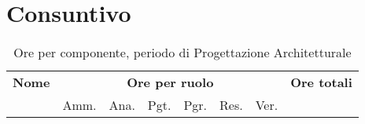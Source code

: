 \section{Consuntivo}
\label{consuntivo}
\begin{table}[H]
\begin{tabular}{lccccccc}
\toprule
    \textbf{Nome}  & \multicolumn{6}{c}{\textbf{Ore per ruolo}} & \textbf{Ore totali} \\
     & Amm. & Ana. & Pgt. & Pgr. & Res. & Ver. & \\
    \midrule
    
    	
    
    \bottomrule
\end{tabular}
\caption{Ore per componente, periodo di Progettazione Architetturale}
\end{table}

